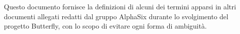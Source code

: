 Questo documento fornisce la definizioni di alcuni dei termini apparsi in altri documenti allegati redatti 
dal gruppo AlphaSix durante lo svolgimento del progetto Butterfly, con
lo scopo di evitare ogni forma di ambiguit\`a.
